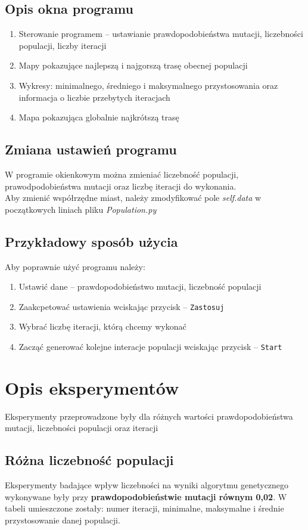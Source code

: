 \documentclass[a4paper,11pt]{article}
\begin{document}
		\subsection{Opis okna programu}
				\begin{enumerate}
					\item Sterowanie programem -- ustawianie prawdopodobieństwa mutacji, liczebności populacji, liczby iteracji
					\item Mapy pokazujące najlepszą i najgorszą trasę obecnej populacji
					\item Wykresy: minimalnego, średniego i maksymalnego przystosowania oraz informacja o liczbie przebytych iteracjach
					\item Mapa pokazująca globalnie najkrótszą trasę
				\end{enumerate}	
		\subsection{Zmiana ustawień programu}
			W programie okienkowym można zmieniać liczebność populacji, prawodpodobieństwa mutacji oraz liczbę iteracji do wykonania.\\
			Aby zmienić współrzędne miast, należy zmodyfikować pole \textit{self.data} w początkowych liniach pliku \textit{Population.py}
		\subsection{Przykładowy sposób użycia}
		Aby poprawnie użyć programu należy:
		\begin{enumerate}
		\item Ustawić dane -- prawdopodobieństwo mutacji, liczebność populacji
		\item Zaakcpetować ustawienia wciskając przycisk -- \texttt{Zastosuj}
		\item Wybrać liczbę iteracji, którą chcemy wykonać
		\item Zacząć generować kolejne interacje populacji wciskając przycisk -- \texttt{Start}
		\end{enumerate}	
	\section{Opis eksperymentów}
	Eksperymenty przeprowadzone były dla różnych wartości prawdopodobieństwa mutacji, liczebności populacji oraz iteracji
	
		\subsection{Różna liczebność populacji}
			Eksperymenty badające wpływ liczebności na wyniki algorytmu genetycznego wykonywane były przy \textbf{prawdopodobieństwie mutacji równym 0,02}. W tabeli umieszczone zostały: numer iteracji, minimalne, maksymalne i średnie przystosowanie danej populacji.
\end{document}
